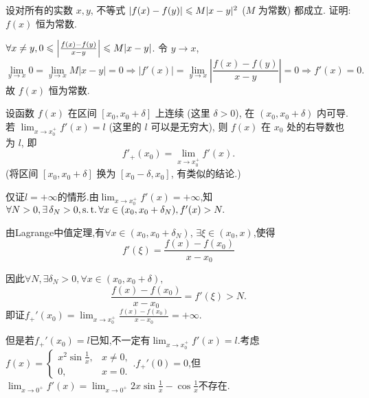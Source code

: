 \begin{exercise}[3.3.12]
    设对所有的实数 $x,y$, 不等式 $|f(x)-f(y)| \leqslant M|x-y|^2$ ($M$ 为常数) 都成立. 证明: $f(x)$ 恒为常数.
\end{exercise}

\begin{solution}
    $\forall x \ne y, 0 \leqslant \left|\frac{f(x)-f(y)}{x-y}\right| \leqslant M|x-y|$. 令 $y \to x$,
$$ \lim_{y\to x} 0 = \lim_{y\to x} M|x-y| = 0 \Rightarrow |f'(x)| = \lim_{y\to x} \left|\frac{f(x) - f(y)}{x-y}\right| = 0 \Rightarrow f'(x) = 0. $$
故 $f(x)$ 恒为常数.
\end{solution}

\begin{exercise}[3.3.13]
    设函数 $f(x)$ 在区间 $[x_0, x_0+\delta]$ 上连续 (这里 $\delta>0$), 在 $(x_0, x_0+\delta)$ 内可导. 若 $\lim_{x \to x_0^+} f'(x) = l$ (这里的 $l$ 可以是无穷大), 则 $f(x)$ 在 $x_0$ 处的右导数也为 $l$, 即
    $$ f'_+(x_0) = \lim_{x \to x_0^+} f'(x). $$
    (将区间 $[x_0, x_0+\delta]$ 换为 $[x_0-\delta, x_0]$, 有类似的结论.)
\end{exercise}


\begin{solution}
    仅证$l=+\infty$的情形.由$\lim_{x \to x_0^+} f'(x) = +\infty$,知$\forall N > 0, \exists \delta_N > 0, \st \forall x \in (x_0, x_0 + \delta_N), f'(x) > N.$

    由Lagrange中值定理,有$\forall x \in (x_0,x_0 + \delta_N)$, $\exists \xi \in (x_0,x)$,使得$$f'(\xi) = \frac{f(x)-f(x_0)}{x-x_0}$$

    因此$\forall N, \exists \delta_N > 0 , \forall x \in (x_0,x_0+\delta),$
    $$\frac{f(x)-f(x_0)}{x-x_0} = f'(\xi) > N.$$
    即证$f_+'(x_0) = \lim_{x \to x_0^+} \frac{f(x)-f(x_0)}{x-x_0} = + \infty.$
\end{solution}

但是若$f_+'(x_0)=l$已知,不一定有$\lim_{x \to x_0^+} f'(x) = l$.考虑$f(x) = \begin{cases} x^2\sin\frac{1}{x}, & x \ne 0, \\ 0, & x = 0. \end{cases}$.$f_+'(0) = 0$,但$\lim_{x \to 0^+} f'(x) = \lim_{x \to 0^+} 2x\sin\frac{1}{x} - \cos\frac{1}{x}$不存在.



